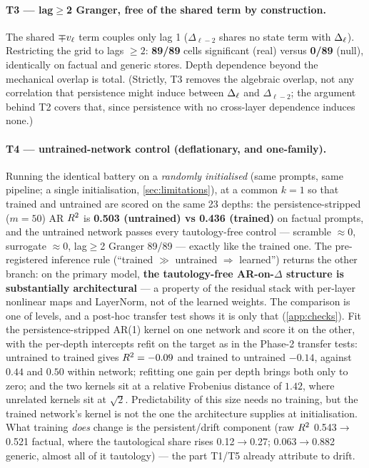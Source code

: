 \paragraph{T3 --- lag$\ge$2 Granger, free of the shared term by construction.}
The shared $\mp v_\ell$ term couples only lag 1 ($\Delta_{\ell-2}$ shares no
state term with $\Delta_\ell$). Restricting the grid to lags $\ge 2$:
\textbf{89/89} cells significant (real) versus \textbf{0/89} (null),
identically on factual and generic stores. Depth dependence beyond the
mechanical overlap is total. (Strictly, T3 removes the algebraic overlap, not
any correlation that persistence might induce between $\Delta_\ell$ and
$\Delta_{\ell-2}$; the argument behind T2 covers that, since persistence with
no cross-layer dependence induces none.)

\paragraph{T4 --- untrained-network control (deflationary, and one-family).}
Running the identical battery on a \emph{randomly initialised} \pythia{}
(same prompts, same pipeline; a single initialisation,
\cref{sec:limitations}), at a common $k{=}1$ so that trained and
untrained are scored on the same 23 depths: the persistence-stripped ($m{=}50$)
AR $R^2$ is \textbf{0.503 (untrained) vs 0.436 (trained)} on factual prompts,
and the untrained network passes every tautology-free
control --- scramble $\approx 0$, surrogate $\approx 0$, lag$\ge$2 Granger
89/89 --- exactly like the trained one. The pre-registered inference rule
(``trained $\gg$ untrained $\Rightarrow$ learned'') returns the other branch:
on the primary model, \textbf{the tautology-free AR-on-$\Delta$ structure is
substantially architectural} --- a property of the residual stack with
per-layer nonlinear
maps and LayerNorm, not of the learned weights. The comparison is one of
levels, and a post-hoc transfer test shows it is only that
(\cref{app:checks}). Fit the persistence-stripped AR(1) kernel on one network
and score it on the other, with the per-depth intercepts refit on the target
as in the Phase-2 transfer tests: untrained to trained gives $R^2 = -0.09$
and trained to untrained $-0.14$, against $0.44$ and $0.50$ within network;
refitting one gain per depth brings both only to zero; and the two kernels
sit at a relative Frobenius distance of $1.42$, where unrelated kernels sit
at $\sqrt2$. Predictability of this size needs no training, but the trained
network's kernel is not the one the architecture supplies at initialisation.
What training \emph{does}
change is the persistent/drift component (raw $R^2$ 0.543$\to$0.521 factual,
where the tautological share rises 0.12$\to$0.27; 0.063$\to$0.882 generic,
almost all of it tautology) --- the part T1/T5 already attribute to drift.

